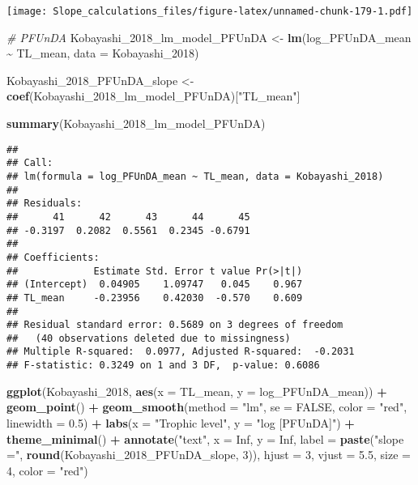 \documentclass[
]{article}
\newenvironment{Shaded}{\begin{snugshade}}{\end{snugshade}}
\newcommand{\AttributeTok}[1]{\textcolor[rgb]{0.13,0.29,0.53}{#1}}
\newcommand{\CommentTok}[1]{\textcolor[rgb]{0.56,0.35,0.01}{\textit{#1}}}
\newcommand{\ConstantTok}[1]{\textcolor[rgb]{0.56,0.35,0.01}{#1}}
\newcommand{\DecValTok}[1]{\textcolor[rgb]{0.00,0.00,0.81}{#1}}
\newcommand{\FloatTok}[1]{\textcolor[rgb]{0.00,0.00,0.81}{#1}}
\newcommand{\FunctionTok}[1]{\textcolor[rgb]{0.13,0.29,0.53}{\textbf{#1}}}
\newcommand{\NormalTok}[1]{#1}
\newcommand{\OtherTok}[1]{\textcolor[rgb]{0.56,0.35,0.01}{#1}}
\newcommand{\SpecialCharTok}[1]{\textcolor[rgb]{0.81,0.36,0.00}{\textbf{#1}}}
\newcommand{\StringTok}[1]{\textcolor[rgb]{0.31,0.60,0.02}{#1}}
\begin{document}
\texttt{[image: Slope\_calculations\_files/figure-latex/unnamed-chunk-179-1.pdf]}

\begin{Shaded}
\begin{Highlighting}[]
\CommentTok{\# PFUnDA}
\NormalTok{Kobayashi\_2018\_lm\_model\_PFUnDA }\OtherTok{\textless{}{-}} \FunctionTok{lm}\NormalTok{(log\_PFUnDA\_mean }\SpecialCharTok{\textasciitilde{}}\NormalTok{ TL\_mean,}
                                    \AttributeTok{data =}\NormalTok{ Kobayashi\_2018)}

\NormalTok{Kobayashi\_2018\_PFUnDA\_slope }\OtherTok{\textless{}{-}} \FunctionTok{coef}\NormalTok{(Kobayashi\_2018\_lm\_model\_PFUnDA)[}\StringTok{"TL\_mean"}\NormalTok{]}

\FunctionTok{summary}\NormalTok{(Kobayashi\_2018\_lm\_model\_PFUnDA)}
\end{Highlighting}
\end{Shaded}

\begin{verbatim}
## 
## Call:
## lm(formula = log_PFUnDA_mean ~ TL_mean, data = Kobayashi_2018)
## 
## Residuals:
##      41      42      43      44      45 
## -0.3197  0.2082  0.5561  0.2345 -0.6791 
## 
## Coefficients:
##             Estimate Std. Error t value Pr(>|t|)
## (Intercept)  0.04905    1.09747   0.045    0.967
## TL_mean     -0.23956    0.42030  -0.570    0.609
## 
## Residual standard error: 0.5689 on 3 degrees of freedom
##   (40 observations deleted due to missingness)
## Multiple R-squared:  0.0977, Adjusted R-squared:  -0.2031 
## F-statistic: 0.3249 on 1 and 3 DF,  p-value: 0.6086
\end{verbatim}

\begin{Shaded}
\begin{Highlighting}[]
\FunctionTok{ggplot}\NormalTok{(Kobayashi\_2018, }\FunctionTok{aes}\NormalTok{(}\AttributeTok{x =}\NormalTok{ TL\_mean, }\AttributeTok{y =}\NormalTok{ log\_PFUnDA\_mean)) }\SpecialCharTok{+}
  \FunctionTok{geom\_point}\NormalTok{() }\SpecialCharTok{+}
  \FunctionTok{geom\_smooth}\NormalTok{(}\AttributeTok{method =} \StringTok{"lm"}\NormalTok{, }\AttributeTok{se =} \ConstantTok{FALSE}\NormalTok{, }\AttributeTok{color =} \StringTok{"red"}\NormalTok{, }\AttributeTok{linewidth =} \FloatTok{0.5}\NormalTok{) }\SpecialCharTok{+}
  \FunctionTok{labs}\NormalTok{(}\AttributeTok{x =} \StringTok{"Trophic level"}\NormalTok{,}
       \AttributeTok{y =} \StringTok{"log [PFUnDA]"}\NormalTok{) }\SpecialCharTok{+}
  \FunctionTok{theme\_minimal}\NormalTok{() }\SpecialCharTok{+}
  \FunctionTok{annotate}\NormalTok{(}\StringTok{"text"}\NormalTok{, }\AttributeTok{x =} \ConstantTok{Inf}\NormalTok{, }\AttributeTok{y =} \ConstantTok{Inf}\NormalTok{, }\AttributeTok{label =} \FunctionTok{paste}\NormalTok{(}\StringTok{"slope ="}\NormalTok{, }\FunctionTok{round}\NormalTok{(Kobayashi\_2018\_PFUnDA\_slope, }\DecValTok{3}\NormalTok{)), }
           \AttributeTok{hjust =} \DecValTok{3}\NormalTok{, }\AttributeTok{vjust =} \FloatTok{5.5}\NormalTok{, }\AttributeTok{size =} \DecValTok{4}\NormalTok{, }\AttributeTok{color =} \StringTok{"red"}\NormalTok{)}
\end{Highlighting}
\end{Shaded}
\end{document}
